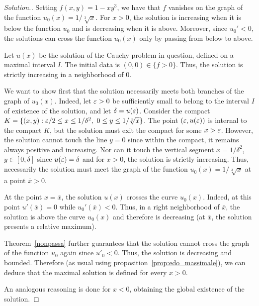 \begin{proof}[Solution.]
Setting $f(x,y)=1 - xy^3$, we have that $f$ vanishes on the graph of the
function $u_0(x)=1/\sqrt[3] x$. For $x>0$, the solution is increasing when it is
below the function $u_0$ and is decreasing when it is above. Moreover, since
$u_0'<0$, the solutions can cross the function $u_0(x)$ only by passing from
below to above.

Let $u(x)$ be the solution of the Cauchy problem in question, defined on a
maximal interval $I$. The initial data is $(0,0)\in \{f>0\}$. Thus, the solution
is strictly increasing in a neighborhood of $0$.

We want to show first that the solution necessarily meets both branches of the
graph of $u_0(x)$. Indeed, let $\varepsilon>0$ be sufficiently small to belong to the
interval $I$ of existence of the solution, and let $\delta=u(\varepsilon)$. Consider
the compact $K=\{(x,y): \varepsilon/2 \le x \le 1/\delta^2,\ 0\le y\le
1/\sqrt[3]{x}\}$. The point $(\varepsilon,u(\varepsilon))$ is internal to the compact $K$, but
the solution must exit the compact for some $x>\varepsilon$. However, the solution
cannot touch the line $y=0$ since within the compact, it remains always positive
and increasing. Nor can it touch the vertical segment $x=1/\delta^2$,
$y\in[0,\delta]$ since $u(\varepsilon)=\delta$ and for $x>0$, the solution is strictly
increasing. Thus, necessarily the solution must meet the graph of the function
$u_0(x)=1/\sqrt[3]{x}$ at a point $\bar x>0$.

At the point $x=\bar x$, the solution $u(x)$ crosses the curve $u_0(x)$. Indeed,
at this point $u'(\bar x)=0$ while $u_0'(\bar x)<0$. Thus, in a right
neighborhood of $\bar x$, the solution is above the curve $u_0(x)$ and therefore
is decreasing (at $\bar x$, the solution presents a relative maximum).

Theorem~\ref{nonpassa} further guarantees that the solution cannot cross the
graph of the function $u_0$ again since $u'_0<0$. Thus, the solution is
decreasing and bounded. Therefore (as usual using
proposition~\ref{prop:edo_massimale}), we can deduce that the maximal solution
is defined for every $x>0$.

An analogous reasoning is done for $x<0$, obtaining the global existence of the
solution.
\end{proof}

